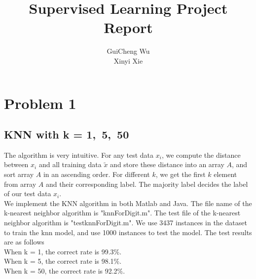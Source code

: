 \documentclass[11pt]{article}
\begin{document}
\lstset{language = c++, basicstyle=\footnotesize,breakatwhitespace=false,showstringspaces=false}
\title{Supervised Learning Project Report}
\author{GuiCheng Wu\\ Xinyi Xie}
\maketitle
\section{Problem 1}
\subsection{KNN with k = 1,~5,~50}
The algorithm is very intuitive. For any test data $x_i$, we compute the distance between $x_i$ and all training data $\tilde{x}$ and store these distance into an array $A$, and sort array $A$ in an ascending order. For different $k$, we get the first $k$ element from array $A$ and their corresponding label. The majority label decides the label of our test data $x_i$.\\

We implement the KNN algorithm in both Matlab and Java. The file name of  the k-nearest neighbor algorithm is "knnForDigit.m". The test file of  the k-nearest neighbor algorithm is "testknnForDigit.m". We use 3437 instances in the dataset to train the knn model, and use 1000 instances to test the model.  The test results are as follows \\
When k = 1, the correct rate is 99.3\%. \\
When k = 5, the correct rate is 98.1\%. \\
When k = 50, the correct rate is 92.2\%.
\end{document}
